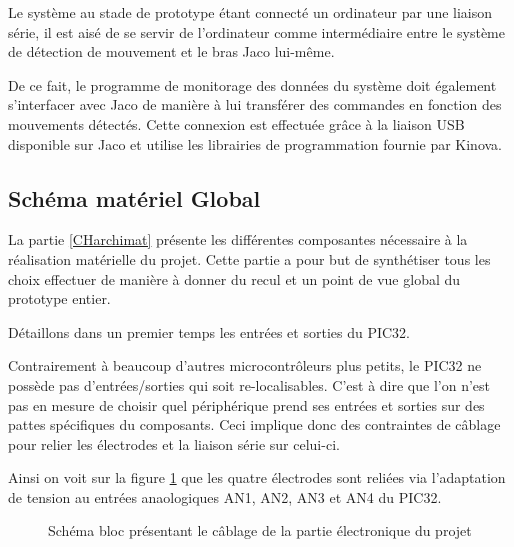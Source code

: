 \documentclass[letterpaper, twoside, 12pt, memoire, creativecommons, hyperref]{thETS}
\begin{document}
Le système au stade de prototype étant connecté un ordinateur par une liaison série, il est aisé de se servir de l'ordinateur comme intermédiaire entre le système de détection de mouvement et le bras Jaco lui-même.

De ce fait, le programme de monitorage des données du système doit également s'interfacer avec Jaco de manière à lui transférer des commandes en fonction des mouvements détectés. Cette connexion est effectuée grâce à la liaison USB disponible sur Jaco et utilise les librairies de programmation fournie par Kinova.

\subsection{Schéma matériel Global}

La partie \ref{CHarchimat} présente les différentes composantes nécessaire à la réalisation matérielle du projet. Cette partie a pour but de synthétiser tous les choix effectuer de manière à donner du recul et un point de vue global du prototype entier. 

Détaillons dans un premier temps les entrées et sorties du PIC32. 

Contrairement à beaucoup d'autres microcontrôleurs plus petits, le PIC32 ne possède pas d'entrées/sorties qui soit re-localisables. C'est à dire que l'on n'est pas en mesure de choisir quel périphérique prend ses entrées et sorties sur des pattes spécifiques du composants. Ceci implique donc des contraintes de câblage pour relier les électrodes et la liaison série sur celui-ci. 

Ainsi on voit sur la figure \ref{fig:cablagePic} que les quatre électrodes sont reliées via l'adaptation de tension au entrées anaologiques AN1, AN2, AN3 et AN4 du PIC32. 

\begin{figure}
	\centering
	\caption{Schéma bloc présentant le câblage de la partie électronique du projet}
	\label{fig:cablagePic}
\end{figure}
\end{document}
